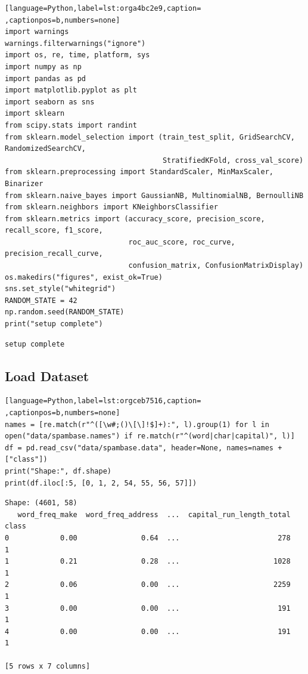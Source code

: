 \documentclass[11pt]{article}
\begin{document}
\begin{lstlisting}[language=Python,label=lst:orga4bc2e9,caption= ,captionpos=b,numbers=none]
import warnings
warnings.filterwarnings("ignore")
import os, re, time, platform, sys
import numpy as np
import pandas as pd
import matplotlib.pyplot as plt
import seaborn as sns
import sklearn
from scipy.stats import randint
from sklearn.model_selection import (train_test_split, GridSearchCV, RandomizedSearchCV,
                                     StratifiedKFold, cross_val_score)
from sklearn.preprocessing import StandardScaler, MinMaxScaler, Binarizer
from sklearn.naive_bayes import GaussianNB, MultinomialNB, BernoulliNB
from sklearn.neighbors import KNeighborsClassifier
from sklearn.metrics import (accuracy_score, precision_score, recall_score, f1_score,
                             roc_auc_score, roc_curve, precision_recall_curve,
                             confusion_matrix, ConfusionMatrixDisplay)
os.makedirs("figures", exist_ok=True)
sns.set_style("whitegrid")
RANDOM_STATE = 42
np.random.seed(RANDOM_STATE)
print("setup complete")
\end{lstlisting}

\begin{verbatim}
setup complete
\end{verbatim}

\subsection*{Load Dataset}
\label{sec:orgc71ed65}

\begin{lstlisting}[language=Python,label=lst:orgceb7516,caption= ,captionpos=b,numbers=none]
names = [re.match(r"^([\w#;()\[\]!$]+):", l).group(1) for l in open("data/spambase.names") if re.match(r"^(word|char|capital)", l)]
df = pd.read_csv("data/spambase.data", header=None, names=names + ["class"])
print("Shape:", df.shape)
print(df.iloc[:5, [0, 1, 2, 54, 55, 56, 57]])
\end{lstlisting}

\begin{verbatim}
Shape: (4601, 58)
   word_freq_make  word_freq_address  ...  capital_run_length_total  class
0            0.00               0.64  ...                       278      1
1            0.21               0.28  ...                      1028      1
2            0.06               0.00  ...                      2259      1
3            0.00               0.00  ...                       191      1
4            0.00               0.00  ...                       191      1

[5 rows x 7 columns]
\end{verbatim}
\end{document}
